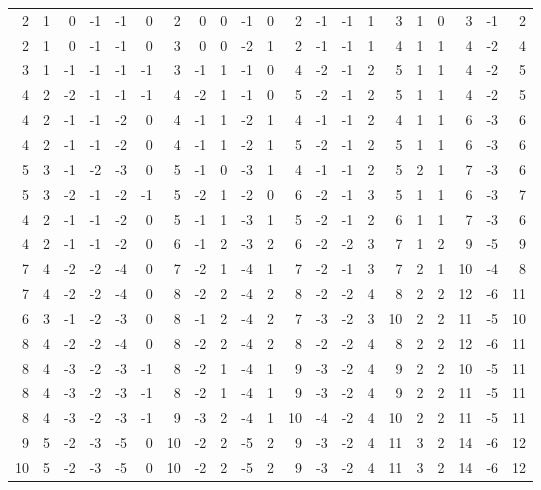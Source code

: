 \begin{center}\scriptsize
\begin{tabular}{*{21}{r}}
2 & 1 & 0 & -1 & -1 & 0 & 2 & 0 & 0 & -1 & 0 & 2 & -1 & -1 & 1 & 3 & 1 & 0 & 3 & -1 & 2 \\
2 & 1 & 0 & -1 & -1 & 0 & 3 & 0 & 0 & -2 & 1 & 2 & -1 & -1 & 1 & 4 & 1 & 1 & 4 & -2 & 4 \\
3 & 1 & -1 & -1 & -1 & -1 & 3 & -1 & 1 & -1 & 0 & 4 & -2 & -1 & 2 & 5 & 1 & 1 & 4 & -2 & 5 \\
4 & 2 & -2 & -1 & -1 & -1 & 4 & -2 & 1 & -1 & 0 & 5 & -2 & -1 & 2 & 5 & 1 & 1 & 4 & -2 & 5 \\
4 & 2 & -1 & -1 & -2 & 0 & 4 & -1 & 1 & -2 & 1 & 4 & -1 & -1 & 2 & 4 & 1 & 1 & 6 & -3 & 6 \\
4 & 2 & -1 & -1 & -2 & 0 & 4 & -1 & 1 & -2 & 1 & 5 & -2 & -1 & 2 & 5 & 1 & 1 & 6 & -3 & 6 \\
5 & 3 & -1 & -2 & -3 & 0 & 5 & -1 & 0 & -3 & 1 & 4 & -1 & -1 & 2 & 5 & 2 & 1 & 7 & -3 & 6 \\
5 & 3 & -2 & -1 & -2 & -1 & 5 & -2 & 1 & -2 & 0 & 6 & -2 & -1 & 3 & 5 & 1 & 1 & 6 & -3 & 7 \\
4 & 2 & -1 & -1 & -2 & 0 & 5 & -1 & 1 & -3 & 1 & 5 & -2 & -1 & 2 & 6 & 1 & 1 & 7 & -3 & 6 \\
4 & 2 & -1 & -1 & -2 & 0 & 6 & -1 & 2 & -3 & 2 & 6 & -2 & -2 & 3 & 7 & 1 & 2 & 9 & -5 & 9 \\
7 & 4 & -2 & -2 & -4 & 0 & 7 & -2 & 1 & -4 & 1 & 7 & -2 & -1 & 3 & 7 & 2 & 1 & 10 & -4 & 8 \\
7 & 4 & -2 & -2 & -4 & 0 & 8 & -2 & 2 & -4 & 2 & 8 & -2 & -2 & 4 & 8 & 2 & 2 & 12 & -6 & 11 \\
6 & 3 & -1 & -2 & -3 & 0 & 8 & -1 & 2 & -4 & 2 & 7 & -3 & -2 & 3 & 10 & 2 & 2 & 11 & -5 & 10 \\
8 & 4 & -2 & -2 & -4 & 0 & 8 & -2 & 2 & -4 & 2 & 8 & -2 & -2 & 4 & 8 & 2 & 2 & 12 & -6 & 11 \\
8 & 4 & -3 & -2 & -3 & -1 & 8 & -2 & 1 & -4 & 1 & 9 & -3 & -2 & 4 & 9 & 2 & 2 & 10 & -5 & 11 \\
8 & 4 & -3 & -2 & -3 & -1 & 8 & -2 & 1 & -4 & 1 & 9 & -3 & -2 & 4 & 9 & 2 & 2 & 11 & -5 & 11 \\
8 & 4 & -3 & -2 & -3 & -1 & 9 & -3 & 2 & -4 & 1 & 10 & -4 & -2 & 4 & 10 & 2 & 2 & 11 & -5 & 11 \\
9 & 5 & -2 & -3 & -5 & 0 & 10 & -2 & 2 & -5 & 2 & 9 & -3 & -2 & 4 & 11 & 3 & 2 & 14 & -6 & 12 \\
10 & 5 & -2 & -3 & -5 & 0 & 10 & -2 & 2 & -5 & 2 & 9 & -3 & -2 & 4 & 11 & 3 & 2 & 14 & -6 & 12 \\

\end{tabular}
\end{center}
